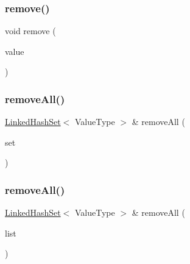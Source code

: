 \subsubsection{\texorpdfstring{remove()}{remove()}}
{\footnotesize\ttfamily void remove (\begin{DoxyParamCaption}\item[{const Value\+Type \&}]{value }\end{DoxyParamCaption})}

\mbox{\label{classLinkedHashSet_a0f6c00ad546a16426d687412d8ed0854}} 
\subsubsection{\texorpdfstring{remove\+All()}{removeAll()}\hspace{0.1cm}{\footnotesize\ttfamily [1/2]}}
{\footnotesize\ttfamily \mbox{\hyperlink{classLinkedHashSet}{Linked\+Hash\+Set}}$<$ Value\+Type $>$ \& remove\+All (\begin{DoxyParamCaption}\item[{const \mbox{\hyperlink{classLinkedHashSet}{Linked\+Hash\+Set}}$<$ Value\+Type $>$ \&}]{set }\end{DoxyParamCaption})}

\mbox{\label{classLinkedHashSet_ac1892347c21e036d81fe91d03d644925}} 
\subsubsection{\texorpdfstring{remove\+All()}{removeAll()}\hspace{0.1cm}{\footnotesize\ttfamily [2/2]}}
{\footnotesize\ttfamily \mbox{\hyperlink{classLinkedHashSet}{Linked\+Hash\+Set}}$<$ Value\+Type $>$ \& remove\+All (\begin{DoxyParamCaption}\item[{std\+::initializer\+\_\+list$<$ Value\+Type $>$}]{list }\end{DoxyParamCaption})}

\mbox{\label{classLinkedHashSet_aa2107a246d515845118008684fcdf7dc}} 
